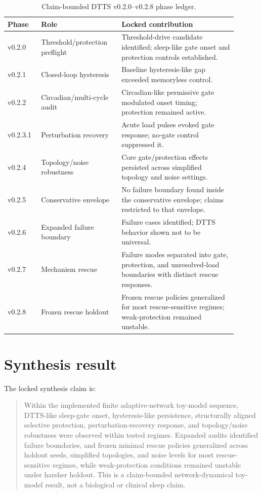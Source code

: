\documentclass[11pt,a4paper]{article}
\begin{document}
\begin{table}[H]
\centering
\small
\begin{tabular}{p{0.12\linewidth}p{0.32\linewidth}p{0.46\linewidth}}
\toprule
Phase & Role & Locked contribution \\
\midrule
v0.2.0 & Threshold/protection preflight & Threshold-drive candidate identified; sleep-like gate onset and protection controls established. \\
v0.2.1 & Closed-loop hysteresis & Baseline hysteresis-like gap exceeded memoryless control. \\
v0.2.2 & Circadian/multi-cycle audit & Circadian-like permissive gate modulated onset timing; protection remained active. \\
v0.2.3.1 & Perturbation recovery & Acute load pulses evoked gate response; no-gate control suppressed it. \\
v0.2.4 & Topology/noise robustness & Core gate/protection effects persisted across simplified topology and noise settings. \\
v0.2.5 & Conservative envelope & No failure boundary found inside the conservative envelope; claims restricted to that envelope. \\
v0.2.6 & Expanded failure boundary & Failure cases identified; DTTS behavior shown not to be universal. \\
v0.2.7 & Mechanism rescue & Failure modes separated into gate, protection, and unresolved-load boundaries with distinct rescue responses. \\
v0.2.8 & Frozen rescue holdout & Frozen rescue policies generalized for most rescue-sensitive regimes; weak-protection remained unstable. \\
\bottomrule
\end{tabular}
\caption{Claim-bounded DTTS v0.2.0--v0.2.8 phase ledger.}
\label{tab:ledger}
\end{table}

\section{Synthesis result}
The locked synthesis claim is:

\begin{quote}
Within the implemented finite adaptive-network toy-model sequence, DTTS-like sleep-gate onset, hysteresis-like persistence, structurally aligned selective protection, perturbation-recovery response, and topology/noise robustness were observed within tested regimes. Expanded audits identified failure boundaries, and frozen minimal rescue policies generalized across holdout seeds, simplified topologies, and noise levels for most rescue-sensitive regimes, while weak-protection conditions remained unstable under harsher holdout. This is a claim-bounded network-dynamical toy-model result, not a biological or clinical sleep claim.
\end{quote}
\end{document}
